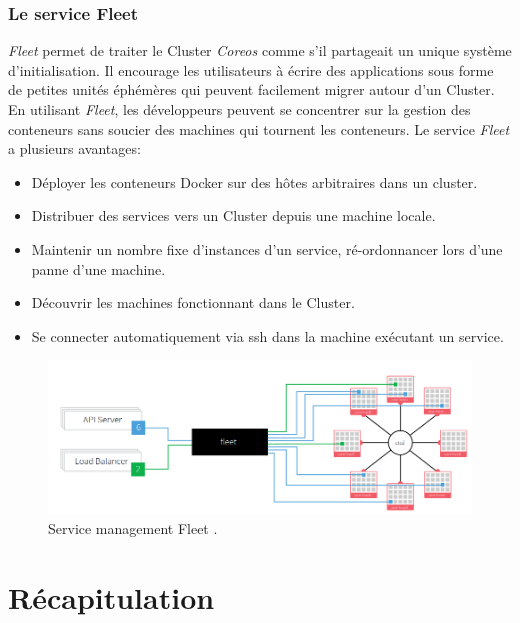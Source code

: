 \begin{onehalfspace}
\subsubsection*{Le service Fleet}
\emph{Fleet} permet de traiter le Cluster \emph{Coreos} comme s'il partageait un unique système d'initialisation. Il encourage les utilisateurs à écrire des applications sous forme de petites unités éphémères qui peuvent facilement migrer autour d'un Cluster. En utilisant \emph{Fleet}, les développeurs peuvent se concentrer sur la gestion des conteneurs sans soucier des machines qui tournent les conteneurs. Le service \emph{Fleet} a plusieurs avantages: 
\begin{itemize}
\item Déployer les conteneurs Docker sur des hôtes arbitraires dans un cluster.
\item Distribuer des services vers un Cluster depuis une machine locale.
\item Maintenir un nombre fixe d'instances d'un service, ré-ordonnancer lors d'une panne d'une machine.
\item Découvrir les machines fonctionnant dans le Cluster.
\item Se connecter automatiquement via \acrshort{ssh} dans la machine exécutant un service.
\end{itemize}
\begin{figure}[H]
\centering
\includegraphics [scale=0.5]{chapitre3/assets/fleet.png}
\caption{Service management Fleet \cite{coreos}.}
\end{figure}
\end{onehalfspace}


\section{Récapitulation}


\def\arraystretch{1.6}%

